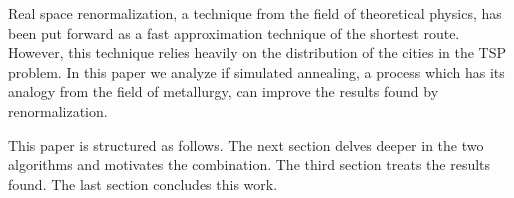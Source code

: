 Real space renormalization\cite{yoshiyuki1995nms}, a technique from the field of theoretical physics,
has been put forward as a fast approximation technique of the shortest route.
However, this technique relies heavily on the distribution of the cities in
the TSP problem. In this paper we analyze if simulated annealing, a process
which has its analogy from the field of metallurgy, can improve the results
found by renormalization.

This paper is structured as follows. The next section delves deeper in the two
algorithms and motivates the combination. The third section treats the results
found. The last section concludes this work.
\IEEEpubidadjcol %


